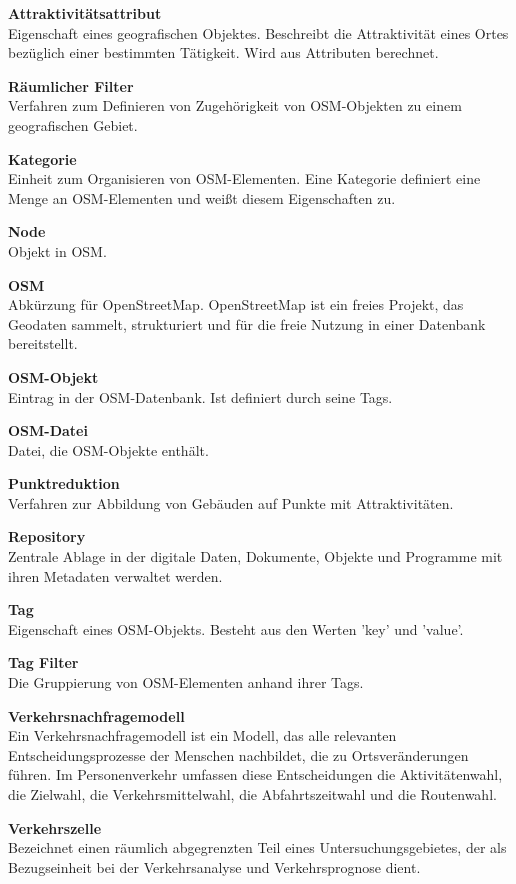\documentclass[parskip=full]{scrartcl} %
\begin{document}
\textbf{Attraktivitätsattribut}\\
Eigenschaft eines geografischen Objektes. Beschreibt die Attraktivität eines Ortes bezüglich einer bestimmten Tätigkeit. Wird aus Attributen berechnet.

\textbf{Räumlicher Filter}\\
Verfahren zum Definieren von Zugehörigkeit von OSM-Objekten zu einem geografischen Gebiet.

\textbf{Kategorie}\\
Einheit zum Organisieren von OSM-Elementen. Eine Kategorie definiert eine Menge an OSM-Elementen und weißt diesem Eigenschaften zu.

\textbf{Node}\\
Objekt in OSM.

\textbf{OSM}\\
Abkürzung für OpenStreetMap. OpenStreetMap ist ein freies Projekt, das Geodaten sammelt, strukturiert und für die freie Nutzung in einer Datenbank bereitstellt.

\textbf{OSM-Objekt}\\
Eintrag in der OSM-Datenbank. Ist definiert durch seine Tags.

\textbf{OSM-Datei}\\
Datei, die OSM-Objekte enthält.

\textbf{Punktreduktion}\\
Verfahren zur Abbildung von Gebäuden auf Punkte mit Attraktivitäten.

\textbf{Repository}\\
Zentrale Ablage in der digitale Daten, Dokumente, Objekte und Programme mit ihren Metadaten verwaltet werden.

\textbf{Tag}\\
Eigenschaft eines OSM-Objekts. Besteht aus den Werten 'key' und 'value'.

\textbf{Tag Filter}\\
Die Gruppierung von OSM-Elementen anhand ihrer Tags.

\textbf{Verkehrsnachfragemodell}\\
Ein Verkehrsnachfragemodell ist ein Modell, das alle relevanten Entscheidungsprozesse der Menschen nachbildet, die zu Ortsveränderungen führen. Im Personenverkehr umfassen diese Entscheidungen die Aktivitätenwahl, die Zielwahl, die Verkehrsmittelwahl, die Abfahrtszeitwahl und die Routenwahl.

\textbf{Verkehrszelle}\\
Bezeichnet einen räumlich abgegrenzten Teil eines Untersuchungsgebietes, der als Bezugseinheit bei der Verkehrsanalyse und Verkehrsprognose dient.
\end{document}
